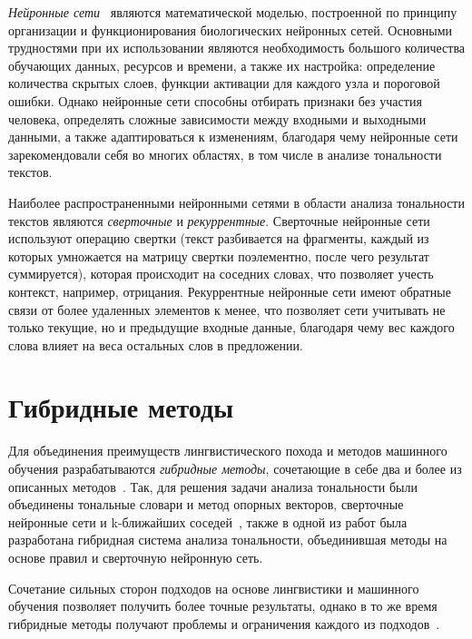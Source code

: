 \textit{Нейронные сети}~\cite{article05} являются математической моделью,
построенной по принципу организации и функционирования биологических нейронных
сетей. Основными трудностями при их использовании являются необходимость
большого количества обучающих данных, ресурсов и времени, а также  их настройка:
определение количества скрытых слоев, функции активации для каждого узла и
пороговой ошибки. Однако нейронные сети способны отбирать признаки без участия
человека, определять сложные зависимости между входными и выходными данными, а
также адаптироваться к изменениям, благодаря чему нейронные сети зарекомендовали
себя во многих областях, в том числе в анализе тональности текстов.

Наиболее распространенными нейронными сетями в области анализа тональности
текстов являются \textit{сверточные} и \textit{рекуррентные}. Сверточные
нейронные сети используют операцию свертки (текст разбивается на фрагменты,
каждый из которых умножается на матрицу свертки поэлементно, после чего результат
суммируется), которая происходит на соседних словах, что позволяет учесть
контекст, например, отрицания. Рекуррентные нейронные сети имеют  обратные связи
от более удаленных элементов к менее, что позволяет сети учитывать не только
текущие, но и предыдущие входные данные, благодаря чему вес каждого слова влияет
на веса остальных слов в предложении.

\section{Гибридные методы}

Для объединения преимуществ лингвистического похода и методов машинного обучения
разрабатываются \textit{гибридные методы}, сочетающие в себе два и более из описанных
методов~\cite{article08}. Так, для решения задачи анализа тональности были
объединены тональные словари и метод опорных векторов, сверточные нейронные сети
и k-ближайших соседей~\cite{article09}, также в одной из работ была разработана
гибридная система анализа тональности, объединившая методы на основе
правил и сверточную нейронную сеть.

Сочетание сильных сторон подходов на основе лингвистики и машинного обучения
позволяет получить более точные результаты, однако в то же время гибридные
методы получают проблемы и ограничения каждого из
подходов~\cite{article12}.

